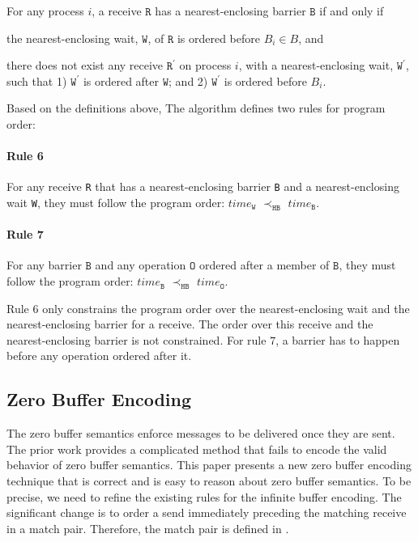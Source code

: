 \begin{definition}\label{def:nb}
For any process $i$, a receive $\mathtt{R}$ has a nearest-enclosing barrier $\mathtt{B}$ if and only if
\begin{compactenum}
\item the nearest-enclosing wait, $\mathtt{W}$, of $\mathtt{R}$ is ordered before $B_i\in B$, and
\item there does not exist any receive $\mathtt{R^\prime}$ on process $i$, with a nearest-enclosing wait, $\mathtt{W^\prime}$, such that 1) $\mathtt{W^\prime}$ is ordered after $\mathtt{W}$; and 2) $\mathtt{W^\prime}$ is ordered before $B_i$.
\end{compactenum}
\end{definition}

Based on the definitions above, The algorithm defines two rules for program order:

\paragraph*{Rule 6} For any receive \texttt{R} that has a nearest-enclosing barrier \texttt{B} and a nearest-enclosing wait \texttt{W}, they must follow the program order:
$\mathit{time}_\mathtt{W}$ $\prec_\mathtt{HB}$ $\mathit{time}_\mathtt{B}$.

\paragraph*{Rule 7} For any barrier $\mathtt{B}$ and any operation $\mathtt{O}$ ordered after a member of $\mathtt{B}$, they must follow the program order: $\mathit{time}_\mathtt{B}$
$\prec_\mathtt{HB}$ $\mathit{time}_\mathtt{O}$.

Rule $6$ only constrains the program order over the nearest-enclosing wait and the nearest-enclosing barrier for a receive. The order over this receive and the nearest-enclosing barrier is not constrained. For rule $7$, a barrier has to happen before any operation ordered after it. 

\subsection{Zero Buffer Encoding}
The zero buffer semantics enforce messages to be delivered once they are sent. The prior work \cite{DBLP:conf/kbse/HuangMM13} provides a complicated method that fails to encode the valid behavior of zero buffer semantics. This paper presents a new zero buffer encoding technique that is correct and is easy to reason about zero buffer semantics. To be precise, we need to refine the existing rules for the infinite buffer encoding. The significant change is to order a send immediately preceding the matching receive in a match pair. Therefore, the match pair is defined in . 

